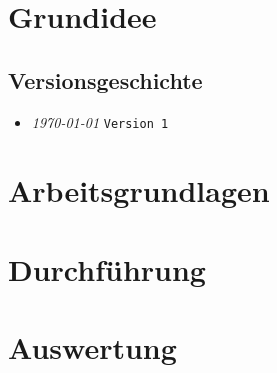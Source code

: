\documentclass{fhnwreport/fhnwreport}
\begin{document}


\clearpage
\pagestyle{empty}
{
    \renewcommand{\thispagestyle}[1]{}

    \section*{Grundidee}
    \label{sec:grundidee}
    


    \clearpage
    \tableofcontents
    \vspace{5mm}
    \subsection*{Versionsgeschichte}
    \begin{itemize}
        \item[]
            \emph{\today} \texttt{Version 1}
    \end{itemize}
}

\clearpage
\setcounter{page}{1}
\pagestyle{headings}


\clearpage
\section{Arbeitsgrundlagen}
\label{sec:arbeitsgrundlagen}



\clearpage
\section{Durchf\"uhrung}
\label{sec:durchfuehrung}



\clearpage
\section{Auswertung}
\label{sec:auswertung}

\end{document}
